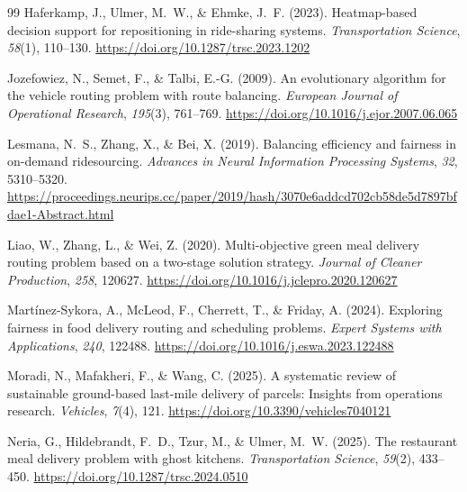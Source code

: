 \documentclass[12pt,a4paper]{report}
\begin{document}
\begin{thebibliography}{99}
Haferkamp, J., Ulmer, M.~W., \& Ehmke, J.~F. (2023).
\newblock Heatmap-based decision support for repositioning in ride-sharing systems.
\newblock \textit{Transportation Science}, \textit{58}(1), 110--130.
\newblock \url{https://doi.org/10.1287/trsc.2023.1202}

Jozefowiez, N., Semet, F., \& Talbi, E.-G. (2009).
\newblock An evolutionary algorithm for the vehicle routing problem with route balancing.
\newblock \textit{European Journal of Operational Research}, \textit{195}(3), 761--769.
\newblock \url{https://doi.org/10.1016/j.ejor.2007.06.065}

Lesmana, N.~S., Zhang, X., \& Bei, X. (2019).
\newblock Balancing efficiency and fairness in on-demand ridesourcing.
\newblock \textit{Advances in Neural Information Processing Systems}, \textit{32}, 5310--5320.
\newblock \url{https://proceedings.neurips.cc/paper/2019/hash/3070e6addcd702cb58de5d7897bfdae1-Abstract.html}

Liao, W., Zhang, L., \& Wei, Z. (2020).
\newblock Multi-objective green meal delivery routing problem based on a two-stage solution strategy.
\newblock \textit{Journal of Cleaner Production}, \textit{258}, 120627.
\newblock \url{https://doi.org/10.1016/j.jclepro.2020.120627}

Mart\'{i}nez-Sykora, A., McLeod, F., Cherrett, T., \& Friday, A. (2024).
\newblock Exploring fairness in food delivery routing and scheduling problems.
\newblock \textit{Expert Systems with Applications}, \textit{240}, 122488.
\newblock \url{https://doi.org/10.1016/j.eswa.2023.122488}

Moradi, N., Mafakheri, F., \& Wang, C. (2025).
\newblock A systematic review of sustainable ground-based last-mile delivery of parcels: Insights from operations research.
\newblock \textit{Vehicles}, \textit{7}(4), 121.
\newblock \url{https://doi.org/10.3390/vehicles7040121}

Neria, G., Hildebrandt, F.~D., Tzur, M., \& Ulmer, M.~W. (2025).
\newblock The restaurant meal delivery problem with ghost kitchens.
\newblock \textit{Transportation Science}, \textit{59}(2), 433--450.
\newblock \url{https://doi.org/10.1287/trsc.2024.0510}


\end{thebibliography}
\end{document}
